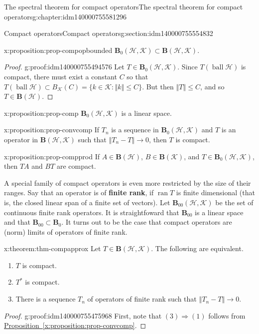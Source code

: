 \documentclass[oneside,10pt,]{book}
\newcommand{\xreffont}{\relax}
\newcommand{\terminology}[1]{\textbf{#1}}
\numberwithin{equation}{section}
\DeclareMathOperator{\ball}{ball}
\newcommand{\hilbert}{\mathcal{H}}
\newcommand{\K}{\mathcal{K}}
\newcommand{\BOP}{\mathbf{B}}
\newcommand{\BH}{\mathbf{B}(\mathcal{H})}
\newcommand{\norm}[1]{\left\Vert#1\right\Vert}
\newcommand{\ran}[1]{\operatorname{ran}#1}
\newcommand{\ad}{^\ast}
\numberwithin{equation}{section}
\begin{document}
\begin{chapterptx}{The spectral theorem for compact operators}{}{The spectral theorem for compact operators}{}{}{g:chapter:idm140000755581296}
\begin{sectionptx}{Compact operators}{}{Compact operators}{}{}{g:section:idm140000755554832}
\begin{proposition}{}{}{x:proposition:prop-compopbounded}%
\(\BOP_0(\hilbert,\K) \subset \BOP(\hilbert, \K)\).%
\end{proposition}
\begin{proof}{}{g:proof:idm140000755494576}
Let \(T \in \BOP_0(\hilbert, \K)\). Since \(T(\ball \hilbert)\) is compact, there must exist a constant \(C\) so that \(T(\ball \hilbert) \subset B_\K(C) = \{k \in \K : \norm{k} \leq C\}\). But then \(\norm{T} \leq C\), and so \(T \in \BH\).%
\end{proof}
\begin{proposition}{}{}{x:proposition:prop-comp}%
\(\BOP_0(\hilbert, \K)\) is a linear space.%
\end{proposition}
\begin{proposition}{}{}{x:proposition:prop-convcomp}%
If \(T_n\) is a sequence in \(\BOP_0(\hilbert, \K)\) and \(T\) is an operator in \(\BOP(\hilbert, \K)\) such that \(\norm{T_n - T} \to 0\), then \(T\) is compact.%
\end{proposition}
\begin{proposition}{}{}{x:proposition:prop-compprod}%
If \(A \in \BOP(\hilbert)\), \(B \in \BOP(\K)\), and \(T \in \BOP_0(\hilbert, \K)\), then \(TA\) and \(BT\) are compact.%
\end{proposition}
A special family of compact operators is even more restricted by the size of their ranges. Say that an operator is of \terminology{finite rank}, if \(\ran T\) is finite dimensional (that is, the closed linear span of a finite set of vectors). Let \(\BOP_{00}(\hilbert, \K)\) be the set of continuous finite rank operators. It is straightfoward that \(\BOP_{00}\) is a linear space and that \(\BOP_{00} \subset \BOP_0\). It turns out to be the case that compact operators are (norm) limits of operators of finite rank.%
\begin{theorem}{}{}{x:theorem:thm-compapprox}%
Let \(T \in \BOP(\hilbert, \K)\). The following are equivalent.%
\begin{enumerate}
\item{}\(T\) is compact.%
\item{}\(T\ad\) is compact.%
\item{}There is a sequence \(T_n\) of operators of finite rank such that \(\norm{T_n - T} \to 0\).%
\end{enumerate}
%
\end{theorem}
\begin{proof}{}{g:proof:idm140000755475968}
First, note that \((3) \Rightarrow (1)\) follows from \hyperref[x:proposition:prop-convcomp]{Proposition~{\xreffont\ref{x:proposition:prop-convcomp}}}.%

\end{proof}
\end{sectionptx}
\end{chapterptx}
\end{document}
